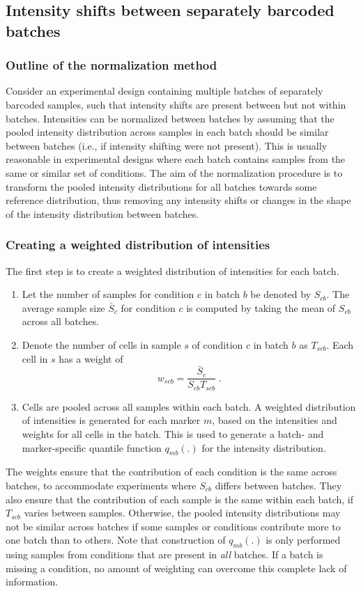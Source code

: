 \documentclass{article}
\begin{document}
\subsection{Intensity shifts between separately barcoded batches}
\label{sec:intnorm}

\subsubsection{Outline of the normalization method}
Consider an experimental design containing multiple batches of separately barcoded samples, such that intensity shifts are present between but not within batches.
Intensities can be normalized between batches by assuming that the pooled intensity distribution across samples in each batch should be similar between batches (i.e., if intensity shifting were not present).
This is usually reasonable in experimental designs where each batch contains samples from the same or similar set of conditions.
The aim of the normalization procedure is to transform the pooled intensity distributions for all batches towards some reference distribution, thus removing any intensity shifts or changes in the shape of the intensity distribution between batches.

\subsubsection{Creating a weighted distribution of intensities}
The first step is to create a weighted distribution of intensities for each batch.
\begin{enumerate}
    \item Let the number of samples for condition $c$ in batch $b$ be denoted by $S_{cb}$.
        The average sample size $\bar{S}_c$ for condition $c$ is computed by taking the mean of $S_{cb}$ across all batches.
    \item Denote the number of cells in sample $s$ of condition $c$ in batch $b$ as $T_{scb}$.
        Each cell in $s$ has a weight of 
        \[
            w_{scb} = \frac{\bar{S}_c}{S_{cb}T_{scb}} \;.
        \]
    \item Cells are pooled across all samples within each batch.
        A weighted distribution of intensities is generated for each marker $m$, based on the intensities and weights for all cells in the batch.
        This is used to generate a batch- and marker-specific quantile function $q_{mb}(.)$ for the intensity distribution.
\end{enumerate}
The weights ensure that the contribution of each condition is the same across batches, to accommodate experiments where $S_{cb}$ differs between batches.
They also ensure that the contribution of each sample is the same within each batch, if $T_{scb}$ varies between samples.
Otherwise, the pooled intensity distributions may not be similar across batches if some samples or conditions contribute more to one batch than to others.
Note that construction of $q_{mb}(.)$ is only performed using samples from conditions that are present in \textit{all} batches.
If a batch is missing a condition, no amount of weighting can overcome this complete lack of information.
\end{document}
